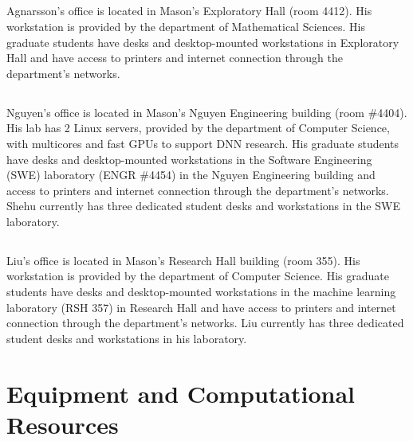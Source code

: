 \documentclass[11pt]{article}
\newcommand{\alert}[1]{{\color{blue}{#1}}}
\begin{document}
\subsection*{\alert{Agnarsson Lab}} Agnarsson's office is located in Mason's Exploratory Hall (room 4412). His workstation is provided by the department of Mathematical Sciences. His graduate students have desks and desktop-mounted workstations in Exploratory Hall and have access to printers and internet connection through the department’s networks.

\subsection*{\alert{Nguyen Lab}} Nguyen's office is located in Mason's Nguyen Engineering building (room \#4404). His lab has 2 Linux servers, provided by the department of Computer Science, with multicores and fast GPUs to support DNN research. His graduate students have desks and desktop-mounted workstations in the Software Engineering (SWE) laboratory (ENGR \#4454) in the Nguyen Engineering building and access to printers and internet connection through the department’s networks. Shehu currently has three dedicated student desks and workstations in the SWE laboratory.

\subsection*{\alert{Liu Lab}} Liu's office is located in Mason's Research Hall building (room 355). His workstation is provided by the department of Computer Science. His graduate students have desks and desktop-mounted workstations in the machine learning laboratory (RSH 357) in Research Hall and have access to printers and internet connection through the department’s networks. Liu currently has three dedicated student desks and workstations in his laboratory.




\section*{Equipment and Computational Resources}
\end{document}
